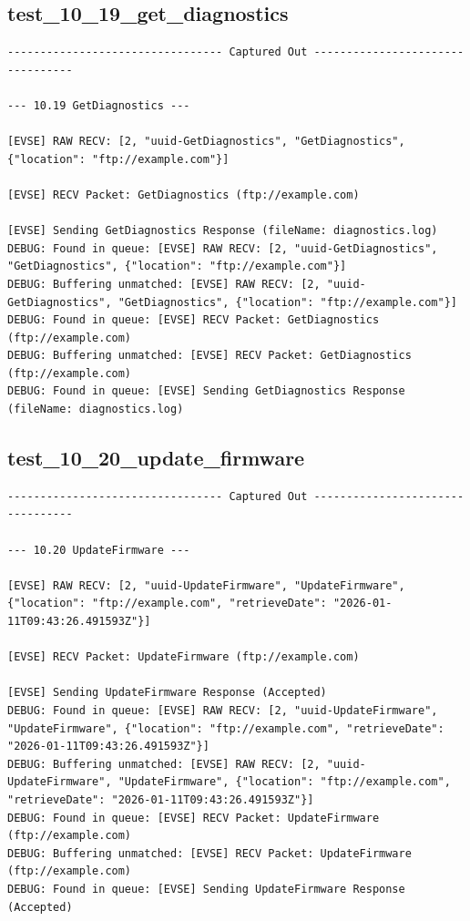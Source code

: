 \documentclass{article}
\begin{document}
\subsection*{test\_10\_19\_get\_diagnostics}
\begin{lstlisting}
--------------------------------- Captured Out ---------------------------------

--- 10.19 GetDiagnostics ---

[EVSE] RAW RECV: [2, "uuid-GetDiagnostics", "GetDiagnostics", {"location": "ftp://example.com"}]

[EVSE] RECV Packet: GetDiagnostics (ftp://example.com)

[EVSE] Sending GetDiagnostics Response (fileName: diagnostics.log)
DEBUG: Found in queue: [EVSE] RAW RECV: [2, "uuid-GetDiagnostics", "GetDiagnostics", {"location": "ftp://example.com"}]
DEBUG: Buffering unmatched: [EVSE] RAW RECV: [2, "uuid-GetDiagnostics", "GetDiagnostics", {"location": "ftp://example.com"}]
DEBUG: Found in queue: [EVSE] RECV Packet: GetDiagnostics (ftp://example.com)
DEBUG: Buffering unmatched: [EVSE] RECV Packet: GetDiagnostics (ftp://example.com)
DEBUG: Found in queue: [EVSE] Sending GetDiagnostics Response (fileName: diagnostics.log)
\end{lstlisting}
\subsection*{test\_10\_20\_update\_firmware}
\begin{lstlisting}
--------------------------------- Captured Out ---------------------------------

--- 10.20 UpdateFirmware ---

[EVSE] RAW RECV: [2, "uuid-UpdateFirmware", "UpdateFirmware", {"location": "ftp://example.com", "retrieveDate": "2026-01-11T09:43:26.491593Z"}]

[EVSE] RECV Packet: UpdateFirmware (ftp://example.com)

[EVSE] Sending UpdateFirmware Response (Accepted)
DEBUG: Found in queue: [EVSE] RAW RECV: [2, "uuid-UpdateFirmware", "UpdateFirmware", {"location": "ftp://example.com", "retrieveDate": "2026-01-11T09:43:26.491593Z"}]
DEBUG: Buffering unmatched: [EVSE] RAW RECV: [2, "uuid-UpdateFirmware", "UpdateFirmware", {"location": "ftp://example.com", "retrieveDate": "2026-01-11T09:43:26.491593Z"}]
DEBUG: Found in queue: [EVSE] RECV Packet: UpdateFirmware (ftp://example.com)
DEBUG: Buffering unmatched: [EVSE] RECV Packet: UpdateFirmware (ftp://example.com)
DEBUG: Found in queue: [EVSE] Sending UpdateFirmware Response (Accepted)
\end{lstlisting}
\end{document}
